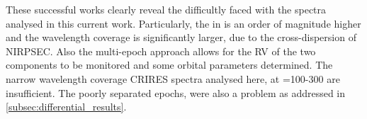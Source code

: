 These successful works clearly reveal the difficultly faced with the spectra analysed in this current work. Particularly, the \snr{} in \citep{piskorz_evidence_2016} is an order of magnitude higher and the wavelength coverage is significantly larger, due to the cross-dispersion of NIRPSEC. Also the multi-epoch approach allows for the {RV} of the two components to be monitored and some orbital parameters determined. The narrow wavelength coverage CRIRES spectra analysed here, at \snr{}=100-300 are insufficient. The poorly separated epochs, were also a problem as addressed in \cref{subsec:differential_results}.


